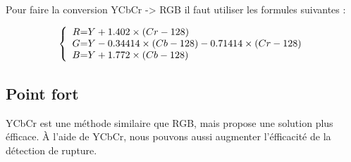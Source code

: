 Pour faire la conversion YCbCr -> RGB il faut utiliser les formules suivantes :

\[
 \left \{
 \begin{array}{c @{=} l}
	R & Y + 1.402 \times (Cr - 128) \\
	G & Y - 0.34414 \times (Cb - 128) - 0.71414 \times (Cr - 128) \\
	B & Y + 1.772 \times (Cb - 128) \\
 \end{array}
 \right.
\]


\subsection{Point fort}
YCbCr est une méthode similaire que RGB, mais propose une solution plus éfficace. À l’aide de YCbCr, nous pouvons aussi augmenter l’éfficacité de la détection de rupture.
